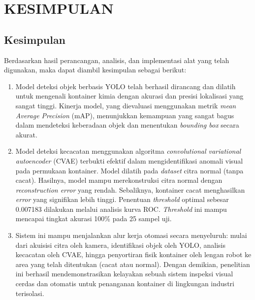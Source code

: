 \chapter{KESIMPULAN}
\section{Kesimpulan}
Berdasarkan hasil perancangan, analisis, dan implementasi alat yang
telah digunakan, maka dapat diambil kesimpulan sebagai berikut:
\begin{enumerate}
  \item Model deteksi objek berbasis YOLO telah berhasil dirancang dan
    dilatih untuk mengenali kontainer kimia dengan akurasi dan
    presisi lokalisasi yang sangat tinggi. Kinerja model, yang
    dievaluasi menggunakan metrik \textit{mean Average Precision} (mAP),
    menunjukkan kemampuan yang sangat bagus dalam mendeteksi
    keberadaan objek dan menentukan \textit{bounding box} secara akurat.
  \item Model deteksi kecacatan menggunakan algoritma \textit{convolutional
    variational autoencoder} (CVAE) terbukti efektif dalam
    mengidentifikasi anomali visual pada permukaan kontainer. Model
    dilatih pada \textit{dataset} citra normal (tanpa cacat). Hasilnya, model
    mampu merekonstruksi citra normal dengan \textit{reconstruction
    error} yang rendah. Sebaliknya, kontainer cacat menghasilkan \textit{error}
    yang signifikan lebih tinggi. Penentuan \textit{threshold} optimal sebesar
    0.007183 dilakukan melalui analisis kurva ROC. \textit{Threshold} ini
    mampu mencapai tingkat akurasi 100\% pada 25 sampel uji.
  \item Sistem ini mampu menjalankan alur kerja otomasi secara
    menyeluruh: mulai dari akuisisi citra oleh kamera, identifikasi
    objek oleh YOLO, analisis kecacatan oleh CVAE, hingga penyortiran
    fisik kontainer oleh lengan robot ke area yang telah ditentukan
    (cacat atau normal). Dengan demikian, penelitian ini berhasil
    mendemonstrasikan kelayakan sebuah sistem inspeksi visual cerdas
    dan otomatis untuk penanganan kontainer di lingkungan industri terisolasi.
\end{enumerate}

\vspace{1em}

